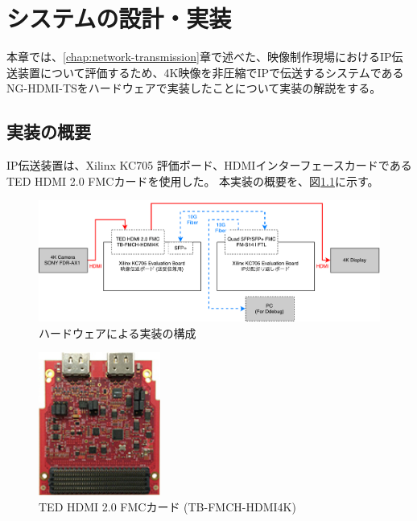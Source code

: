 \chapter{システムの設計・実装}
\label{chap:implementation}

本章では、\ref{chap:network-transmission}章で述べた、映像制作現場におけるIP伝送装置について評価するため、4K映像を非圧縮でIPで伝送するシステムであるNG-HDMI-TSをハードウェアで実装したことについて実装の解説をする。

\section{実装の概要}

IP伝送装置は、Xilinx KC705 評価ボード、HDMIインターフェースカードであるTED HDMI 2.0 FMCカードを使用した。
本実装の概要を、図\ref{fig:fpga-implement-flow}に示す。

\begin{figure}[htbp]
  \begin{center}
    \includegraphics[bb=0 0 841 299,width=15.5cm]{img/fpga-implement-flow.pdf}
  \end{center}
  \caption{ハードウェアによる実装の構成}
  \label{fig:fpga-implement-flow}
\end{figure}

\begin{figure}[htbp]
  \begin{center}
    \includegraphics[bb=0 0 137 161,width=4cm]{img/ted-4k-fmc-card.jpg}
  \end{center}
  \caption{TED HDMI 2.0 FMCカード (TB-FMCH-HDMI4K)}
  \label{fig:ted-4k-fmc-card}
\end{figure}

